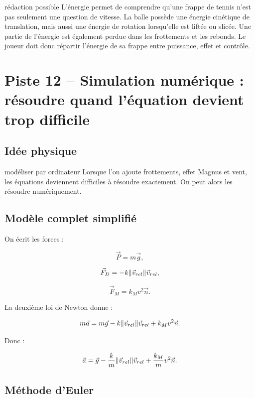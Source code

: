 \documentclass[11pt,a4paper]{article}
\begin{document}
\begin{oral}{rédaction possible}
L'énergie permet de comprendre qu'une frappe de tennis n'est pas seulement une question de vitesse. La balle possède une énergie cinétique de translation, mais aussi une énergie de rotation lorsqu'elle est liftée ou slicée. Une partie de l'énergie est également perdue dans les frottements et les rebonds. Le joueur doit donc répartir l'énergie de sa frappe entre puissance, effet et contrôle.
\end{oral}

\section{Piste 12 -- Simulation numérique : résoudre quand l'équation devient trop difficile}

\subsection{Idée physique}

\begin{idee}{modéliser par ordinateur}
Lorsque l'on ajoute frottements, effet Magnus et vent, les équations deviennent difficiles à résoudre exactement. On peut alors les résoudre numériquement.
\end{idee}

\subsection{Modèle complet simplifié}

On écrit les forces :

\[
\vec{P}=m\vec{g},
\]

\[
\vec{F}_D=-k\norm{\vec{v}_{rel}}\vec{v}_{rel},
\]

\[
\vec{F}_M=k_M v^2 \vec{n}.
\]

La deuxième loi de Newton donne :

\[
m\vec{a}=m\vec{g}-k\norm{\vec{v}_{rel}}\vec{v}_{rel}+k_Mv^2\vec{n}.
\]

Donc :

\[
\vec{a}=\vec{g}-\frac{k}{m}\norm{\vec{v}_{rel}}\vec{v}_{rel}+\frac{k_M}{m}v^2\vec{n}.
\]

\subsection{Méthode d'Euler}
\end{document}
